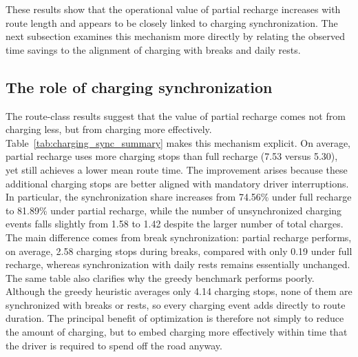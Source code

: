 \documentclass[3p,11pt,authoryear]{elsarticle}  %
\begin{document}
These results show that the operational value of partial recharge increases with route length and appears to be closely linked to charging synchronization. The next subsection examines this mechanism more directly by relating the observed time savings to the alignment of charging with breaks and daily rests.


\subsection{The role of charging synchronization}  %

The route-class results suggest that the value of partial recharge comes not from charging less, but from charging more effectively. Table~\ref{tab:charging_sync_summary} makes this mechanism explicit. On average, partial recharge uses more charging stops than full recharge (7.53 versus 5.30), yet still achieves a lower mean route time. The improvement arises because these additional charging stops are better aligned with mandatory driver interruptions. In particular, the synchronization share increases from 74.56\% under full recharge to 81.89\% under partial recharge, while the number of unsynchronized charging events falls slightly from 1.58 to 1.42 despite the larger number of total charges. The main difference comes from break synchronization: partial recharge performs, on average, 2.58 charging stops during breaks, compared with only 0.19 under full recharge, whereas synchronization with daily rests remains essentially unchanged. The same table also clarifies why the greedy benchmark performs poorly. Although the greedy heuristic averages only 4.14 charging stops, none of them are synchronized with breaks or rests, so every charging event adds directly to route duration. The principal benefit of optimization is therefore not simply to reduce the amount of charging, but to embed charging more effectively within time that the driver is required to spend off the road anyway.
\end{document}
